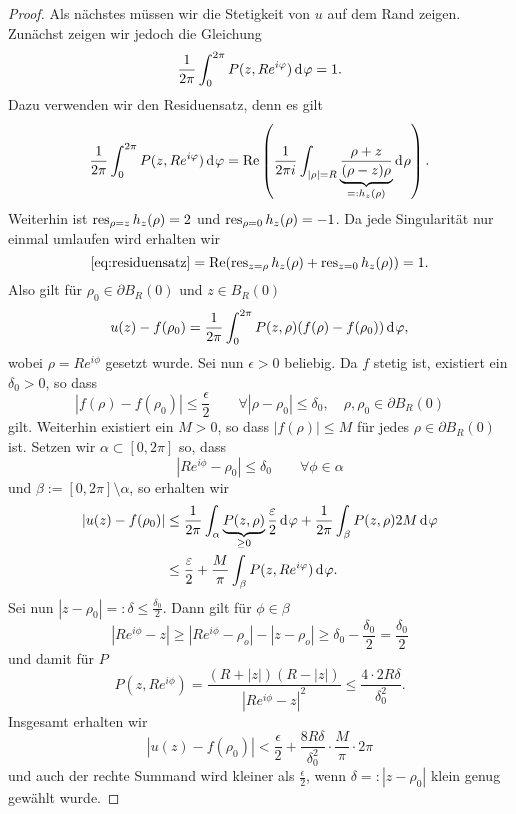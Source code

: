 \begin{proof}
  Als nächstes müssen wir die Stetigkeit von $u$ auf dem Rand
  zeigen. Zunächst zeigen wir jedoch die Gleichung
  \[
  \frac{1}{2\pi} \int_0^{2\pi} P(z, Re^{i\phi}) \d[\phi] = 1.
  \]
  Dazu verwenden wir den Residuensatz, denn es gilt
  \begin{align}
  \frac{1}{2\pi} \int_0^{2\pi} P(z, Re^{i\phi}) \d[\phi]
  = \Re \left ( \frac{1}{2\pi i} \int_{|\rho| = R} \underbrace{
      \frac{\rho + z}{(\rho - z)\rho}}_{=:h_z(\rho)} \d[\rho] \right
  ). \label{eq:residuensatz}
  \end{align}
  Weiterhin ist $\operatorname{res}_{\rho = z} h_z(\rho) = 2$ und $\operatorname{res}_{\rho=0}
  h_z(\rho) = -1$. Da jede Singularität nur einmal umlaufen wird
  erhalten wir
  \[
  \eqref{eq:residuensatz} = \operatorname{Re}(\operatorname{res}_{z = \rho}h_z(\rho) + \operatorname{res}_{z =
    0} h_z(\rho)) = 1.
  \]
  Also gilt für $\rho_0 \in \partial B_R(0)$ und $z \in B_R(0)$
  \[
  u(z) - f(\rho_0) = \frac{1}{2\pi} \int_0^{2\pi} P(z, \rho) (f (\rho)
  - f(\rho_0) )\d[\phi],
  \]
  wobei $\rho = Re^{i\phi}$ gesetzt wurde. Sei nun $\epsilon > 0$ beliebig. Da $f$
  stetig ist, existiert ein $\delta_0 > 0$, so dass
  \[
  |f(\rho) - f(\rho_0)| \leq \frac{\epsilon}{2} \qquad \forall |\rho -
  \rho_0| \leq \delta_0, \quad \rho, \rho_0 \in \partial B_R(0)
  \]
  gilt. Weiterhin existiert ein $M > 0$, so dass $|f(\rho)| \leq M$ für
  jedes $\rho \in \partial B_R(0)$ ist. Setzen wir $\alpha \subset [0, 2\pi]$
  so, dass
  \[
  |R e^{i\phi} - \rho_0| \leq \delta_0 \qquad \forall \phi \in \alpha
  \]
  und $\beta := [0, 2\pi]\setminus \alpha$, so erhalten wir
  \begin{align*}
    |u(z) - f(\rho_0)| & \leq \frac{1}{2\pi} \int_\alpha
    \underbrace{P(z, \rho)}_{\geq 0} \frac{\epsilon}{2} \d[\phi] +
    \frac{1}{2\pi} \int_\beta P(z, \rho) 2 M \d[\phi] \\
    & \leq \frac{\epsilon}{2} + \frac{M}{\pi} \int_\beta P(z,
    Re^{i\phi}) \d[\phi].
  \end{align*}
  Sei nun $|z - \rho_0| =: \delta \leq \frac{\delta_0}{2}$. Dann gilt
  für $\phi \in \beta$
  \[
  |Re^{i\phi} - z| \geq |Re^{i\phi} - \rho_o| - |z - \rho_o| \geq
  \delta_0 - \frac{\delta_0}{2} = \frac{\delta_0}{2}
  \]
  und damit für $P$
  \[
  P(z, Re^{i\phi}) = \frac{(R+ |z|)(R - |z|)}{|Re^{i\phi} - z|^2} \leq
  \frac{4 \cdot 2 R \delta}{\delta_0^2}.
  \]
  Insgesamt erhalten wir
  \[
  |u(z) - f(\rho_0)| < \frac{\epsilon}{2} + \frac{8 R
    \delta}{\delta_0^2} \cdot \frac{M}{\pi} \cdot 2\pi
  \]
  und auch der rechte Summand wird kleiner als
  $\frac{\epsilon}{2}$, wenn $\delta =: |z - \rho_0|$ klein genug
  gewählt wurde.
\end{proof}


